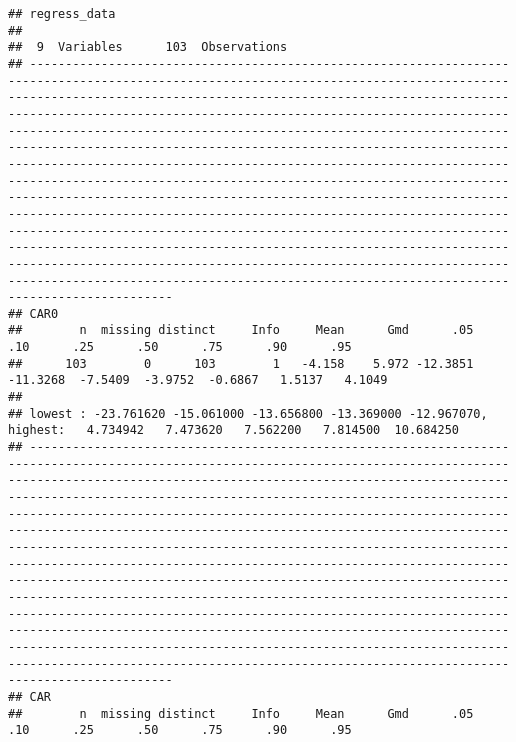 \documentclass[]{article}
\begin{document}
\begin{verbatim}
## regress_data 
## 
##  9  Variables      103  Observations
## ----------------------------------------------------------------------------------------------------------------------------------------------------------------------------------------------------------------------------------------------------------------------------------------------------------------------------------------------------------------------------------------------------------------------------------------------------------------------------------------------------------------------------------------------------------------------------------------------------------------------------------------------------------------------------------------------------------------------------------------------------------------------------------------------------------------------------------------------------------------------------------------------------------------------------------------------------------------------------------------------------------------------------------------
## CAR0 
##        n  missing distinct     Info     Mean      Gmd      .05      .10      .25      .50      .75      .90      .95 
##      103        0      103        1   -4.158    5.972 -12.3851 -11.3268  -7.5409  -3.9752  -0.6867   1.5137   4.1049 
## 
## lowest : -23.761620 -15.061000 -13.656800 -13.369000 -12.967070, highest:   4.734942   7.473620   7.562200   7.814500  10.684250
## ----------------------------------------------------------------------------------------------------------------------------------------------------------------------------------------------------------------------------------------------------------------------------------------------------------------------------------------------------------------------------------------------------------------------------------------------------------------------------------------------------------------------------------------------------------------------------------------------------------------------------------------------------------------------------------------------------------------------------------------------------------------------------------------------------------------------------------------------------------------------------------------------------------------------------------------------------------------------------------------------------------------------------------------
## CAR 
##        n  missing distinct     Info     Mean      Gmd      .05      .10      .25      .50      .75      .90      .95 

\end{verbatim}
\end{document}
